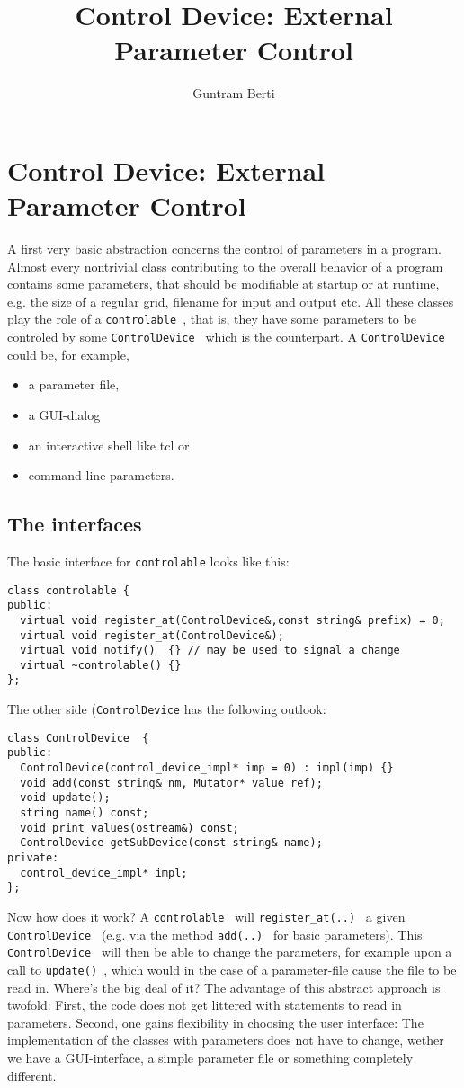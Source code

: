 \documentclass{article}
\title{Control Device: External Parameter Control}
\author{Guntram Berti}
\begin{document}
 \section{Control Device: External Parameter Control}
 
 A first very basic abstraction concerns the control of parameters
 in a program. Almost every nontrivial class contributing to the
 overall behavior of a program contains some parameters, that should
 be modifiable at startup or at runtime, e.g. the size of a regular grid,
 filename for input and output etc. All these classes play the role of a
 {\tt  controlable }, that is, they have some parameters to be 
 controled by some {\tt  ControlDevice } which is the counterpart.
 A {\tt  ControlDevice } could be, for example,

 \begin{itemize}
 \item  a parameter file,
 \item  a GUI-dialog 
 \item  an interactive shell like tcl or
 \item  command-line parameters.
 \end{itemize}

\subsection{The interfaces}
The basic interface  for {\tt controlable} looks like this:

\begin{verbatim}
class controlable {
public:
  virtual void register_at(ControlDevice&,const string& prefix) = 0;
  virtual void register_at(ControlDevice&);
  virtual void notify()  {} // may be used to signal a change
  virtual ~controlable() {}
};
\end{verbatim}
    
The other side ({\tt ControlDevice} has the following outlook:

\begin{verbatim}
class ControlDevice  {
public:
  ControlDevice(control_device_impl* imp = 0) : impl(imp) {}
  void add(const string& nm, Mutator* value_ref);
  void update();
  string name() const;
  void print_values(ostream&) const;
  ControlDevice getSubDevice(const string& name);
private:
  control_device_impl* impl;
};
\end{verbatim}
    
    Now how does it work? A {\tt  controlable } will {\tt  register\_at(..) }
    a given  {\tt  ControlDevice } (e.g. via the method {\tt  add(..) } for
    basic parameters). This {\tt  ControlDevice } will then be able to change
    the parameters, for example upon a call to {\tt  update() }, which would
    in the case of a parameter-file cause the file to be read in.
    Where's the big deal of it? The advantage of this abstract approach is
    twofold: First, the code does not get littered with statements to read in
    parameters. Second, one gains flexibility in choosing the user interface:
    The implementation of the classes with parameters  does not have to change, 
    wether we have a GUI-interface, a simple parameter file or something 
    completely different.
 
\end{document}
